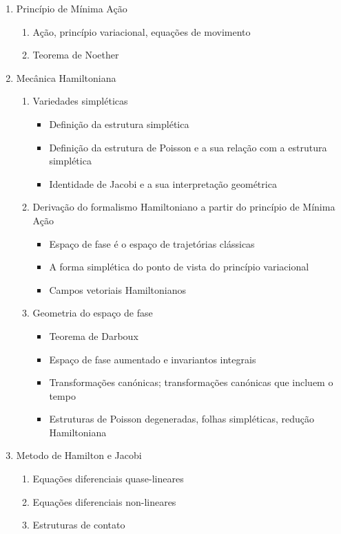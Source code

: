 \documentclass[12pt]{article}
\begin{document}
\begin{enumerate}
\item Princípio de Mínima Ação
   \begin{enumerate}
   \item Ação, princípio variacional, equações de movimento
   \item Teorema de Noether
   \end{enumerate}
\item Mecânica Hamiltoniana
   \begin{enumerate}
   \item Variedades simpléticas
      \begin{itemize}
      \item Definição da estrutura simplética
      \item Definição da estrutura de Poisson e a sua relação com a estrutura
         simplética
      \item Identidade de Jacobi e a sua interpretação geométrica
      \end{itemize}
   \item Derivação do formalismo Hamiltoniano a partir do princípio 
      de Mínima Ação
      \begin{itemize}
      \item Espaço de fase é o espaço de trajetórias clássicas
      \item A forma simplética do ponto de vista do princípio variacional
      \item Campos vetoriais Hamiltonianos
      \end{itemize}
   \item Geometria do espaço de fase
      \begin{itemize}
      \item Teorema de Darboux
      \item Espaço de fase aumentado e invariantos integrais
      \item Transformações canónicas; transformações canónicas que incluem o 
         tempo
      \item Estruturas de Poisson degeneradas, folhas simpléticas, redução 
         Hamiltoniana
      \end{itemize}
   \end{enumerate}
\item Metodo de Hamilton e Jacobi
   \begin{enumerate}
   \item Equações diferenciais quase-lineares
   \item Equações diferenciais non-lineares
   \item Estruturas de contato

\end{enumerate}
\end{enumerate}
\end{document}

